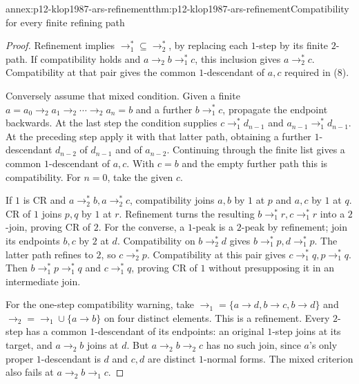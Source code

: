 \begin{annexitem}{annex:p12-klop1987-ars-refinement}{thm:p12-klop1987-ars-refinement}{Compatibility for every finite refining path}
\begin{proof}
Refinement implies \(\to_1^*\subseteq\to_2^*\), by replacing
each \(1\)-step by its finite \(2\)-path. If compatibility holds
and \(a\to_2b\to_1^*c\), this inclusion gives
\(a\to_2^*c\). Compatibility at that pair gives the common
\(1\)-descendant of \(a,c\) required in (8).

Conversely assume that mixed condition. Given a finite
\(a=a_0\to_2a_1\to_2\cdots\to_2a_n=b\) and a further
\(b\to_1^*c\), propagate the endpoint backwards. At the last
step the condition supplies \(c\to_1^*d_{n-1}\) and
\(a_{n-1}\to_1^*d_{n-1}\). At the preceding step apply it
with that latter path, obtaining a further \(1\)-descendant
\(d_{n-2}\) of \(d_{n-1}\) and of \(a_{n-2}\).
Continuing through the finite list gives a common \(1\)-descendant
of \(a,c\). With \(c=b\) and the empty further path this
is compatibility. For \(n=0\), take the given \(c\).

If \(1\) is CR and \(a\to_2^*b,a\to_2^*c\), compatibility
joins \(a,b\) by \(1\) at \(p\) and \(a,c\) by \(1\)
at \(q\). CR of \(1\) joins \(p,q\) by \(1\) at \(r\).
Refinement turns the resulting \(b\to_1^*r,c\to_1^*r\)
into a \(2\)-join, proving CR of \(2\).
For the converse, a \(1\)-peak is a \(2\)-peak by refinement;
join its endpoints \(b,c\) by \(2\) at \(d\). Compatibility
on \(b\to_2^*d\) gives \(b\to_1^*p,d\to_1^*p\).
The latter path refines to \(2\), so \(c\to_2^*p\).
Compatibility at this pair gives \(c\to_1^*q,p\to_1^*q\).
Then \(b\to_1^*p\to_1^*q\) and \(c\to_1^*q\), proving
CR of \(1\) without presupposing it in an intermediate join.

For the one-step compatibility warning, take
\(\to_1=\{a\to d,b\to c,b\to d\}\) and
\(\to_2=\to_1\cup\{a\to b\}\) on four distinct elements.
This is a refinement. Every \(2\)-step has a common \(1\)-descendant
of its endpoints: an original \(1\)-step joins at its target, and
\(a\to_2b\) joins at \(d\). But \(a\to_2b\to_2c\)
has no such join, since \(a\)'s only proper \(1\)-descendant
is \(d\) and \(c,d\) are distinct \(1\)-normal forms.
The mixed criterion also fails at \(a\to_2b\to_1c\).
\end{proof}
\end{annexitem}

